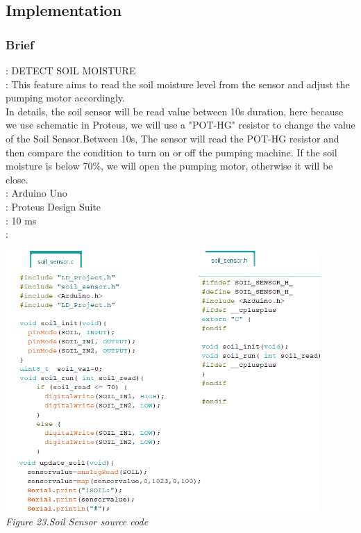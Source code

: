 \documentclass[a4paper]{article}
\begin{document}
\subsection{Implementation}
\subsubsection{Brief}
\text{[TOPIC]}: DETECT SOIL MOISTURE\\
\text{[Description]}: This feature aims to read the soil moisture level from the sensor and adjust the pumping motor accordingly.\medskip\\
In details, the soil sensor will be read value between 10s duration, here because we use schematic in Proteus, we will use a "POT-HG" resistor to change the value of the Soil Sensor.Between 10s, The sensor will read the POT-HG resistor and then compare the condition to turn on or off the pumping machine. If the soil moisture is below 70$\%$, we will open the pumping motor, otherwise it will be close.\medskip\\
\text{[Board]}: Arduino Uno\\
\text{[Simulation]}: Proteus Design Suite\\
: 10 ms\\
:
\medskip
\begin{center}
    \includegraphics[width=12cm]{pictures/Soil_sensor.png}\\
    \textit{Figure 23.Soil Sensor source code}\\
\end{center}
\end{document}
